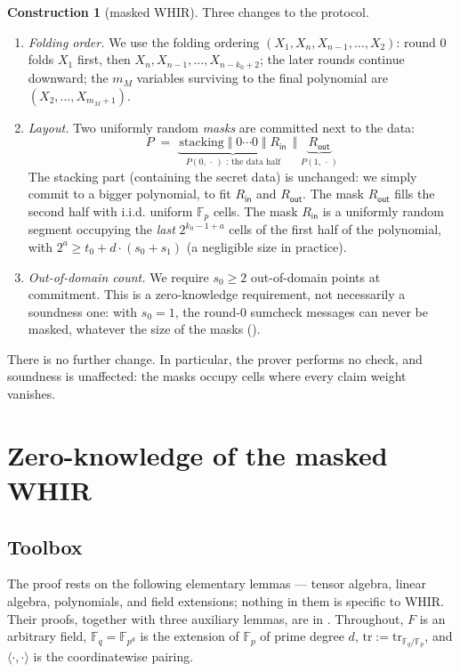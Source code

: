 \documentclass{article}
\newcommand{\Fp}{\mathbb{F}_p}
\newcommand{\Fq}{\mathbb{F}_q}
\newcommand{\extdeg}{d}
\theoremstyle{definition}
\newtheorem{construction}[theorem]{Construction}
\begin{document}
\begin{construction}[masked WHIR]\label{con:masked}
Three changes to the protocol.
\begin{enumerate}
    \item \emph{Folding order.} We use the folding ordering $(X_1, X_n, X_{n-1}, \dots, X_2)$: round 0 folds $X_1$ first, then $X_n, X_{n-1}, \dots, X_{n-k_0+2}$; the later rounds continue downward; the $m_M$ variables surviving to the final polynomial are $(X_2, \dots, X_{m_M + 1})$.
    \item \emph{Layout.} Two uniformly random \emph{masks} are committed next to the data:
    \[
    P \;=\; \underbrace{\,\text{stacking} \;\Vert\; 0 \cdots 0 \;\Vert\; R_{\mathsf{in}}\,}_{P(0,\, \cdot\,) \text{ : the data half}} \;\Big\Vert\; \underbrace{\,R_{\mathsf{out}}\,}_{P(1,\, \cdot\,)}
    \]
    The stacking part (containing the secret data) is unchanged: we simply commit to a bigger polynomial, to fit $R_{\mathsf{in}}$ and $R_{\mathsf{out}}$. The mask $R_{\mathsf{out}}$ fills the second half with i.i.d. uniform $\Fp$ cells. The mask $R_{\mathsf{in}}$ is a uniformly random segment occupying the \emph{last} $2^{k_0 - 1 + a}$ cells of the first half of the polynomial, with $2^a \geq t_0 + \extdeg \cdot (s_0 + s_1)$ (a negligible size in practice).
    \item \emph{Out-of-domain count.} We require $s_0 \geq 2$ out-of-domain points at commitment. This is a zero-knowledge requirement, not necessarily a soundness one: with $s_0 = 1$, the round-0 sumcheck messages can never be masked, whatever the size of the masks ().
\end{enumerate}
\end{construction}

There is no further change. In particular, the prover performs no check, and soundness is unaffected: the masks occupy cells where every claim weight vanishes.

\section{Zero-knowledge of the masked WHIR}\label{sec:zk-proof}

\subsection{Toolbox}\label{sec:toolbox}

The proof rests on the following elementary lemmas --- tensor algebra, linear algebra, polynomials, and field extensions; nothing in them is specific to WHIR. Their proofs, together with three auxiliary lemmas, are in . Throughout, $F$ is an arbitrary field, $\Fq = \mathbb{F}_{p^{\extdeg}}$ is the extension of $\Fp$ of prime degree $\extdeg$, $\mathrm{tr} := \mathrm{tr}_{\Fq/\Fp}$, and $\langle \cdot, \cdot \rangle$ is the coordinatewise pairing.
\end{document}
